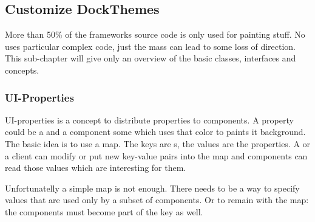 

\subsection{Customize DockThemes}
More than 50\% of the frameworks source code is only used for painting stuff. No  uses particular complex code, just the mass can lead to some loss of direction. This sub-chapter will give only an overview of the basic classes, interfaces and concepts.


\subsubsection{UI-Properties} \label{sec:uiproperties}
UI-properties is a concept to distribute properties to components. A property could be a  and a component some  which uses that color to paints it background. The basic idea is to use a map. The keys are s, the values are the properties. A  or a client can modify or put new key-value pairs into the map and components can read those values which are interesting for them.

Unfortunatelly a simple map is not enough. There needs to be a way to specify values that are used only by a subset of components. Or to remain with the map: the components must become part of the key as well.

